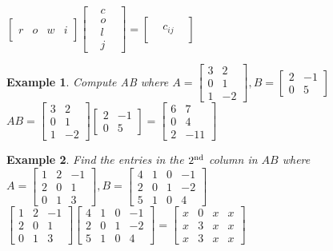 \documentclass[a4paper,12pt,openany]{book}
\theoremstyle{defn}
\theoremstyle{expl}
\newtheorem{expl}{Example}[section]
\begin{document}
$\left[\begin{array}{cccc}&&&\\r&o&w&i\\&&&\end{array}\right]\left[\begin{array}{ccc}&c&\\&o&\\&l&\\&j&\end{array}\right]=\left[\begin{array}{ccc}&&\\&c_{ij}&\\&&\end{array}\right]$\\
\begin{expl}
\textup{Compute AB where $A = \left[\begin{array}{cc}3&2\\0&1\\1&-2\end{array}\right], B = \left[\begin{array}{cc}2&-1\\0&5\end{array}\right]$}\\
$AB=\left[\begin{array}{cc}3&2\\0&1\\1&-2\end{array}\right]\left[\begin{array}{cc}2&-1\\0&5\end{array}\right]=\left[\begin{array}{cc}6&7\\0&4\\2&-11\end{array}\right]$
\end{expl}
\begin{expl}
\textup{Find the entries in the $2^{\textup{nd}}$ column in $AB$ where\\ $A=\left[\begin{array}{ccc}1&2&-1\\2&0&1\\0&1&3\end{array}\right],B=\left[\begin{array}{cccc}4&1&0&-1\\2&0&1&-2\\5&1&0&4\end{array}\right]$}\\
$\left[\begin{array}{ccc}1&2&-1\\2&0&1\\0&1&3\end{array}\right]\left[\begin{array}{cccc}4&1&0&-1\\2&0&1&-2\\5&1&0&4\end{array}\right]=\left[\begin{array}{cccc}x&0&x&x\\x&3&x&x\\x&3&x&x\end{array}\right]$
\end{expl}
\end{document}
